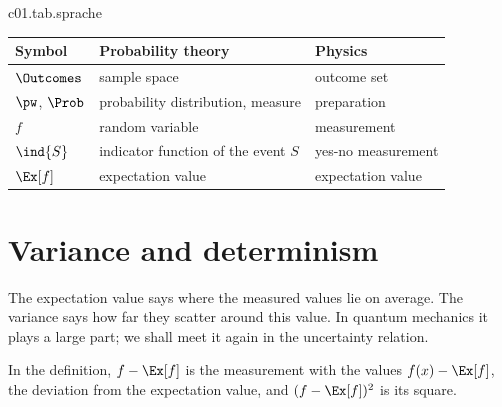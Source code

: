 \begin{tpctable}{c01.tab.sprache}
  \caption{The same things in two languages. On the left the words of probability theory,
    on the right those of physics, which this course uses.}
  \begin{tabular}{lll}
    \toprule
    Symbol & Probability theory & Physics \\
    \midrule
    $\Outcomes$ & sample space & outcome set \\
    $\pw$, $\Prob$ & probability distribution, measure & preparation \\
    $f$ & random variable & measurement \\
    $\ind{S}$ & indicator function of the event $S$ & yes-no measurement \\
    $\Ex[f]$ & expectation value & expectation value \\
    \bottomrule
  \end{tabular}
\end{tpctable}

\section{Variance and determinism}\label{c01.s3}

The expectation value says where the measured values lie on average. The variance says
how far they scatter around this value. In quantum mechanics it plays a large part; we shall
meet it again in the uncertainty relation.


In the definition, $f - \Ex[f]$ is the measurement with the values $f(x) - \Ex[f]$, the
deviation from the expectation value, and $(f - \Ex[f])^2$ is its square.

